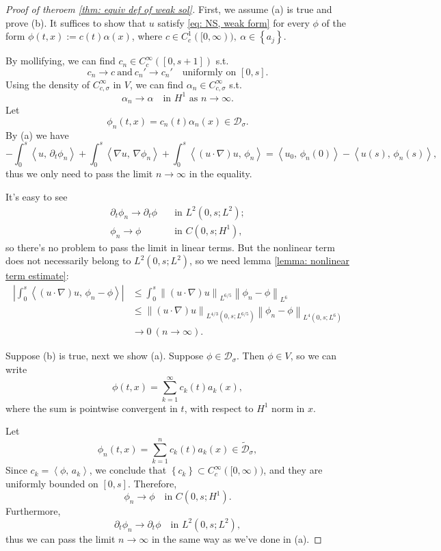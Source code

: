 \documentclass[a4paper, 12pt, oneside]{amsart}
\theoremstyle{definition}
\theoremstyle{remark}
\newcommand{\abs}[1]{\left\lvert #1 \right\rvert}
\newcommand{\norm}[1]{\left\lVert #1 \right\rVert}
\newcommand{\bk}[2]{\left\langle #1,\, #2 \right\rangle}
\newcommand{\set}[1]{\left\{ #1 \right\}}
\renewcommand{\leq}{\leqslant}
\newcommand{\p}{\partial}
\newcommand{\mc}[1]{\mathcal{#1}}
\begin{document}
\begin{proof}[Proof of theroem \ref{thm: equiv def of weak sol}]
    First, we assume (a) is true and prove (b). It suffices to show that $u$ satisfy \eqref{eq: NS, weak form} for every $\phi$ of the form $\phi(t, x):=c(t)\alpha(x)$, where $c\in C_c^1([0, \infty)),\ \alpha\in\set{a_j}$.

    By mollifying, we can find $c_n\in C_c^\infty([0, s+1])$ s.t.
    \[
        c_n\to c\ \text{and}\ c_n'\to c_n'\quad\text{uniformly on $[0, s]$}.
    \]
    Using the density of $C_{c, \sigma}^\infty$ in $V$, we can find $\alpha_n\in C_{c, \sigma}^\infty$ s.t.
    \[
        \alpha_n\to \alpha\quad\text{in $H^1$ as $n\to\infty$}.
    \]
    Let
    \[
        \phi_n(t, x) = c_n(t)\alpha_n(x)\in\mc{D}_\sigma.
    \]
    By (a) we have
    \[
        -\int_0^s\bk{u}{\p_t\phi_n} + \int_0^s\bk{\nabla u}{\nabla\phi_n} + \int_0^s \bk{(u\cdot\nabla)u}{\phi_n} = \bk{u_0}{\phi_n(0)} - \bk{u(s)}{\phi_n(s)},
    \]
    thus we only need to pass the limit $n\to\infty$ in the equality.

    It's easy to see
    \begin{align*}
        \p_t\phi_n\to\p_t\phi&\quad\text{in $L^2(0, s; L^2)$};\\
        \phi_n\to\phi\quad&\quad\text{in $C(0, s; H^1)$},
    \end{align*}
    so there's no problem to pass the limit in linear terms. But the nonlinear term does not necessarily belong to $L^2(0, s; L^2)$, so we need lemma \ref{lemma: nonlinear term estimate}:
    \begin{align*}
        \abs{\int_0^s \bk{(u\cdot\nabla)u}{\phi_n-\phi}}&\leq\int_0^s\norm{(u\cdot\nabla)u}_{L^{6/5}}\norm{\phi_n-\phi}_{L^6}\\
        &\leq\norm{(u\cdot\nabla)u}_{L^{4/3}(0, s; L^{6/5})}\norm{\phi_n-\phi}_{L^4(0, s; L^6)}\\
        &\to 0\ (n\to\infty).
    \end{align*}

    Suppose (b) is true, next we show (a). Suppose $\phi\in\mc{D}_\sigma$. Then $\phi\in V$, so we can write
    \[
        \phi(t, x) = \sum_{k=1}^\infty c_k(t)a_k(x),
    \]
    where the sum is pointwise convergent in $t$, with respect to $H^1$ norm in $x$. 
    
    Let
    \[
        \phi_n(t, x) = \sum_{k=1}^n c_k(t)a_k(x)\in\tilde{\mc{D}}_\sigma,
    \]
    Since $c_k = \bk{\phi}{a_k}$, we conclude that $\set{c_k}\subset C_c^\infty([0, \infty))$, and they are uniformly bounded on $[0, s]$. Therefore,
    \[
        \phi_n\to\phi\quad\text{in $C(0, s; H^1)$}.
    \]
    Furthermore, 
    \[
        \p_t\phi_n\to\p_t\phi\quad\text{in $L^2(0, s; L^2)$},
    \]
    thus we can pass the limit $n\to\infty$ in the same way as we've done in (a).
\end{proof}
\end{document}
